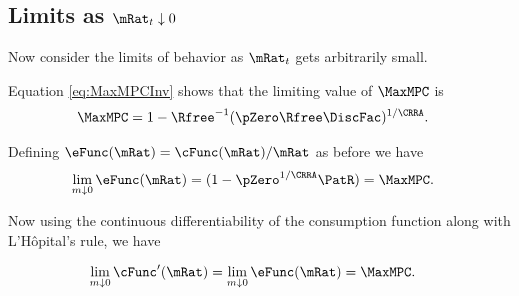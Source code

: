 \documentclass[./BufferStockTheory.tex]{subfiles}
\begin{document}
\begin{comment}
Of course, the constraint never becomes irrelevant if human wealth is
infinite.  We ruled out infinite human wealth at the beginning of this
section by assuming $\Rfree> \PGro$.  If this finite human wealth
condition does not hold, it is possible to show that for any finite
horizon consumer the marginal propensity to consume approaches the
finite-horizon perfect foresight MPC as wealth approaches infinity.
However, as the horizon gets longer, the perfect foresight MPC
approaches zero.  It can be shown therefore that the limiting MPC for
the converged consumption function approaches (but never reaches)
zero.  (This is why we chose $\MinMinMPC=0$ if the \FHWC~fails
in the proofs above.)
\end{comment}

\hypertarget{LimitsAsmtToZero}{}
\subsection{Limits as $\mRat_t \downarrow 0$}

\label{subsec:LimitsAsmtToZero} Now consider the limits of behavior as $\mRat_{t}$ gets
arbitrarily small.

Equation \eqref{eq:MaxMPCInv} shows that the limiting value of
$\MaxMPC$ is
\begin{align}
 \MaxMPC  & = 1-{\Rfree}^{-1}(\pZero  \Rfree\DiscFac)^{1/\CRRA}. \nonumber
\end{align}

Defining $\eFunc(\mRat)=\cFunc(\mRat)/\mRat$ as before we have
\begin{align}
  \lim_{m \downarrow 0} \eFunc(\mRat)  & = (1-\pZero^{1/\CRRA}\PatR) = \MaxMPC \nonumber.
\end{align}

Now using the continuous differentiability of the consumption function
along with L'H\^opital's rule, we have
\begin{comment}
\begin{align*}
    \eFunc^{\prime}(\mRat)  & = \mRat^{-1} \cFunc^{\prime}(\mRat) - \mRat^{-2} \cFunc(\mRat)
\\ \mRat \eFunc^{\prime}(\mRat)  & = \cFunc^{\prime}(\mRat) - \cFunc(\mRat)/\mRat
\\ \cFunc^{\prime}(\mRat)  & = \eFunc(\mRat)+ \mRat \eFunc^{\prime}(\mRat)
\end{align*}
and since $0<\eFunc(\mRat)<1$ we have
\end{comment}
\begin{align}
  \lim_{m \downarrow 0} \cFunc^{\prime}(\mRat)  & = \lim_{m \downarrow 0}
  \eFunc(\mRat) = \MaxMPC. \nonumber
\end{align}
\end{document}
